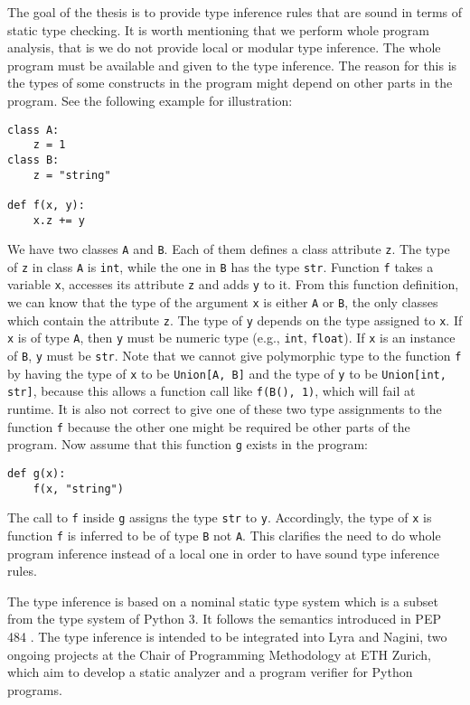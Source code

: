 The goal of the thesis is to provide type inference rules that are sound in terms of static type checking. It is worth mentioning that we perform whole program analysis, that is we do not provide local or modular type inference. The whole program must be available and given to the type inference. The reason for this is the types of some constructs in the program might depend on other parts in the program. See the following example for illustration:
\begin{lstlisting}
class A:
	z = 1
class B:
	z = "string"
	
def f(x, y):
	x.z += y
\end{lstlisting}
We have two classes \lstinline|A| and \lstinline|B|. Each of them defines a class attribute \lstinline|z|. The type of \lstinline|z| in class \lstinline|A| is \lstinline|int|, while the one in \lstinline|B| has the type \lstinline|str|. Function \lstinline|f| takes a variable \lstinline|x|, accesses its attribute \lstinline|z| and adds \lstinline|y| to it. From this function definition, we can know that the type of the argument \lstinline|x| is either \lstinline|A| or \lstinline|B|, the only classes which contain the attribute \lstinline|z|. The type of \lstinline|y| depends on the type assigned to \lstinline|x|. If \lstinline|x| is of type \lstinline|A|, then \lstinline|y| must be numeric type (e.g., \lstinline|int|, \lstinline|float|). If \lstinline|x| is an instance of \lstinline|B|, \lstinline|y| must be \lstinline|str|. Note that we cannot give polymorphic type to the function \lstinline|f| by having the type of \lstinline|x| to be \lstinline|Union[A, B]| and the type of \lstinline|y| to be \lstinline|Union[int, str]|, because this allows a function call like \lstinline|f(B(), 1)|, which will fail at runtime. It is also not correct to give one of these two type assignments to the function \lstinline|f| because the other one might be required be other parts of the program. Now assume that this function \lstinline|g| exists in the program:
\begin{lstlisting}
def g(x):
	f(x, "string")
\end{lstlisting}
The call to \lstinline|f| inside \lstinline|g| assigns the type \lstinline|str| to \lstinline|y|. Accordingly, the type of \lstinline|x| is function \lstinline|f| is inferred to be of type \lstinline|B| not \lstinline|A|. This clarifies the need to do whole program inference instead of a local one in order to have sound type inference rules.

The type inference is based on a nominal static type system which is a subset from the type system of Python 3. It follows the semantics introduced in PEP 484 \cite{484}. The type inference is intended to be integrated into Lyra and Nagini, two ongoing projects at the Chair of Programming Methodology at ETH Zurich, which aim to develop a static analyzer and a program verifier for Python programs.

